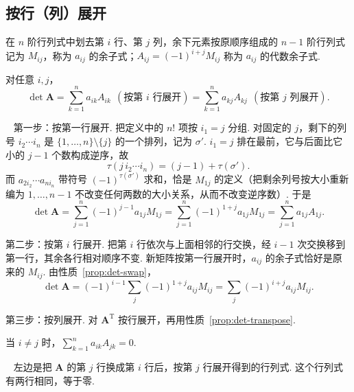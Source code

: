 \documentclass[lang=cn,10.5pt,scheme=chinese,toc=twocol,section,chinesefont=nofont,
twoside,citestyle=gb7714-2015,bibstyle=gb7714-2015]{elegantbook}
\DeclareRobustCommand{\textbf}[1]{{\lnsemiboldlatin\lnsemiboldcjk #1}}
\newcommand{\vv}[1]{\boldsymbol{#1}}
\newcommand{\trans}{\mathrm{T}}             %
\numberwithin{equation}{section}   %
\newcommand*{\lnlabel}[1]{{\sffamily\bfseries\color{black}#1}}
\renewenvironment{proof}{%
	\par\noindent\lnlabel{\proofname}\;\ \color{black!90}\cfs}{\par}
\begin{document}
\subsection{按行（列）展开}

\begin{definition}
  在 $n$ 阶行列式中划去第 $i$ 行、第 $j$ 列，余下元素按原顺序组成的 $n-1$ 阶行列式记为 $M_{ij}$，称为 $a_{ij}$ 的\textbf{余子式}；$A_{ij}=(-1)^{i+j}M_{ij}$ 称为 $a_{ij}$ 的\textbf{代数余子式}.
\end{definition}

\begin{theorem}[按行（列）展开]\label{thm:expansion}
  对任意 $i,j$，
  \[
    \det\vv A=\sum_{k=1}^n a_{ik}A_{ik}\ \ (\text{按第 } i \text{ 行展开})=\sum_{k=1}^n a_{kj}A_{kj}\ \ (\text{按第 } j \text{ 列展开}).
  \]
\end{theorem}
\begin{proof}
  \textbf{第一步：按第一行展开.} 把定义中的 $n!$ 项按 $i_1=j$ 分组. 对固定的 $j$，剩下的列号 $i_2\cdots i_n$ 是 $\{1,\ldots,n\}\setminus\{j\}$ 的一个排列，记为 $\sigma'$. $i_1=j$ 排在最前，它与后面比它小的 $j-1$ 个数构成逆序，故
  \[
    \tau(j\,i_2\cdots i_n)=(j-1)+\tau(\sigma').
  \]
  而 $a_{2i_2}\cdots a_{ni_n}$ 带符号 $(-1)^{\tau(\sigma')}$ 求和，恰是 $M_{1j}$ 的定义（把剩余列号按大小重新编为 $1,\ldots,n-1$ 不改变任何两数的大小关系，从而不改变逆序数）. 于是
  \[
    \det\vv A=\sum_{j=1}^n(-1)^{j-1}a_{1j}M_{1j}=\sum_{j=1}^n(-1)^{1+j}a_{1j}M_{1j}=\sum_{j=1}^na_{1j}A_{1j}.
  \]

  \textbf{第二步：按第 $i$ 行展开.} 把第 $i$ 行依次与上面相邻的行交换，经 $i-1$ 次交换移到第一行，其余各行相对顺序不变. 新矩阵按第一行展开时，$a_{ij}$ 的余子式恰好是原来的 $M_{ij}$. 由性质~\ref{prop:det-swap}，
  \[
    \det\vv A=(-1)^{i-1}\sum_j(-1)^{1+j}a_{ij}M_{ij}=\sum_j(-1)^{i+j}a_{ij}M_{ij}.
  \]

  \textbf{第三步：按列展开.} 对 $\vv A^\trans$ 按行展开，再用性质~\ref{prop:det-transpose}.
\end{proof}

\begin{corollary}[异乘变零]\label{cor:alien}
  当 $i\ne j$ 时，$\sum_{k=1}^n a_{ik}A_{jk}=0$.
\end{corollary}
\begin{proof}
  左边是把 $\vv A$ 的第 $j$ 行换成第 $i$ 行后，按第 $j$ 行展开得到的行列式. 这个行列式有两行相同，等于零.
\end{proof}
\end{document}

